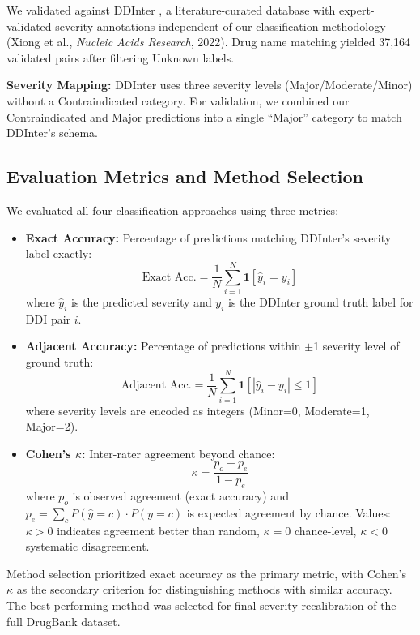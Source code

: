 \documentclass[11pt,a4paper]{article}
\begin{document}
We validated against DDInter \cite{ddinter2022}, a literature-curated database with expert-validated severity annotations independent of our classification methodology (Xiong et al., \textit{Nucleic Acids Research}, 2022). Drug name matching yielded 37,164 validated pairs after filtering Unknown labels. 

\textbf{Severity Mapping:} DDInter uses three severity levels (Major/Moderate/Minor) without a Contraindicated category. For validation, we combined our Contraindicated and Major predictions into a single ``Major'' category to match DDInter's schema.

\subsection*{Evaluation Metrics and Method Selection}

We evaluated all four classification approaches using three metrics:
\begin{itemize}
\item \textbf{Exact Accuracy:} Percentage of predictions matching DDInter's severity label exactly:
\begin{equation}
\text{Exact Acc.} = \frac{1}{N}\sum_{i=1}^{N} \mathbf{1}[\hat{y}_i = y_i]
\end{equation}
where $\hat{y}_i$ is the predicted severity and $y_i$ is the DDInter ground truth label for DDI pair $i$.

\item \textbf{Adjacent Accuracy:} Percentage of predictions within $\pm$1 severity level of ground truth:
\begin{equation}
\text{Adjacent Acc.} = \frac{1}{N}\sum_{i=1}^{N} \mathbf{1}[|\hat{y}_i - y_i| \leq 1]
\end{equation}
where severity levels are encoded as integers (Minor=0, Moderate=1, Major=2).

\item \textbf{Cohen's $\kappa$:} Inter-rater agreement beyond chance:
\begin{equation}
\kappa = \frac{p_o - p_e}{1 - p_e}
\end{equation}
where $p_o$ is observed agreement (exact accuracy) and $p_e = \sum_c P(\hat{y}=c) \cdot P(y=c)$ is expected agreement by chance. Values: $\kappa > 0$ indicates agreement better than random, $\kappa = 0$ chance-level, $\kappa < 0$ systematic disagreement.
\end{itemize}

Method selection prioritized exact accuracy as the primary metric, with Cohen's $\kappa$ as the secondary criterion for distinguishing methods with similar accuracy. The best-performing method was selected for final severity recalibration of the full DrugBank dataset.
\end{document}
